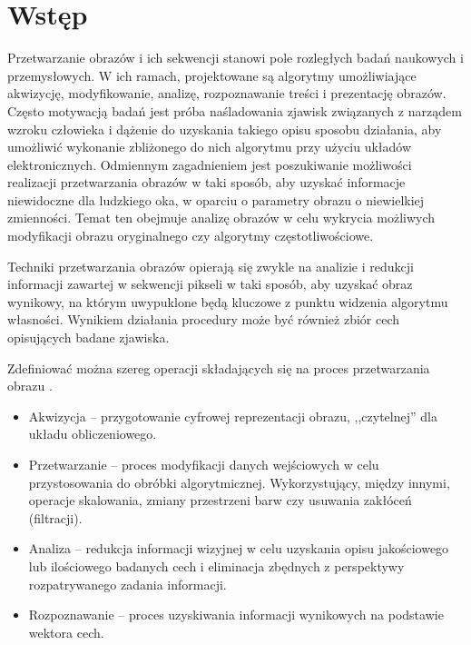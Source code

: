 \chapter{Wstęp}
\label{cha:intruduction}


Przetwarzanie obrazów i ich sekwencji stanowi pole rozległych badań naukowych i przemysłowych.
W ich ramach, projektowane są algorytmy umożliwiające akwizycję, modyfikowanie, analizę, rozpoznawanie treści i prezentację obrazów.
Często motywacją badań jest próba naśladowania zjawisk związanych z narządem wzroku człowieka i dążenie do uzyskania takiego opisu sposobu działania, aby umożliwić wykonanie zbliżonego do nich algorytmu przy użyciu układów elektronicznych. 
Odmiennym zagadnieniem jest poszukiwanie możliwości realizacji przetwarzania obrazów w taki sposób, aby uzyskać informacje niewidoczne dla ludzkiego oka, w oparciu o parametry obrazu o niewielkiej zmienności. Temat ten obejmuje analizę obrazów w celu wykrycia możliwych modyfikacji obrazu oryginalnego czy algorytmy częstotliwościowe. %

Techniki przetwarzania obrazów opierają się zwykle na analizie i redukcji informacji zawartej w sekwencji pikseli w taki sposób, aby uzyskać obraz wynikowy, na którym uwypuklone będą kluczowe z punktu widzenia algorytmu własności.
Wynikiem działania procedury może być również zbiór cech opisujących badane zjawiska.

Zdefiniować można szereg operacji składających się na proces przetwarzania obrazu \cite{Tadeusiewicz1997}.
\begin{itemize}
	\item Akwizycja -- przygotowanie cyfrowej reprezentacji obrazu, ,,czytelnej'' dla układu obliczeniowego.
	
	\item Przetwarzanie -- proces modyfikacji danych wejściowych w celu przystosowania do obróbki algorytmicznej. Wykorzystujący, między innymi, operacje skalowania, zmiany przestrzeni barw czy usuwania zakłóceń (filtracji).
	
	\item Analiza -- redukcja informacji wizyjnej w celu uzyskania opisu jakościowego lub ilościowego badanych cech i eliminacja zbędnych z perspektywy rozpatrywanego zadania informacji.
	
	\item Rozpoznawanie -- proces uzyskiwania informacji wynikowych na podstawie wektora cech.
\end{itemize}

